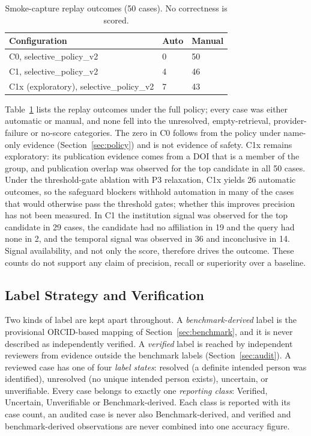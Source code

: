 \begin{table}[t]
\caption{Smoke-capture replay outcomes (50 cases). No correctness is scored.}
\label{tab:smoke-replay}
\centering
\footnotesize
\renewcommand{\arraystretch}{1.1}
\begin{tabular}{@{}p{}p{}p{}@{}}
\toprule
\textbf{Configuration} & \textbf{Auto} & \textbf{Manual} \\
\midrule
C0, selective\_policy\_v2 & 0 & 50 \\
C1, selective\_policy\_v2 & 4 & 46 \\
C1x (exploratory), selective\_policy\_v2 & 7 & 43 \\
\bottomrule
\end{tabular}
\end{table}

Table~\ref{tab:smoke-replay} lists the replay outcomes under the full policy; every case was either automatic or manual, and none fell into the unresolved, empty-retrieval, provider-failure or no-score categories. The zero in C0 follows from the policy under name-only evidence (Section~\ref{sec:policy}) and is not evidence of safety. C1x remains exploratory: its publication evidence comes from a DOI that is a member of the group, and publication overlap was observed for the top candidate in all 50 cases. Under the threshold-gate ablation with P3 relaxation, C1x yields 26 automatic outcomes, so the safeguard blockers withhold automation in many of the cases that would otherwise pass the threshold gates; whether this improves precision has not been measured. In C1 the institution signal was observed for the top candidate in 29 cases, the candidate had no affiliation in 19 and the query had none in 2, and the temporal signal was observed in 36 and inconclusive in 14. Signal availability, and not only the score, therefore drives the outcome. These counts do not support any claim of precision, recall or superiority over a baseline.

\subsection{Label Strategy and Verification}
\label{sec:labels}
Two kinds of label are kept apart throughout. A \emph{benchmark-derived} label is the provisional ORCID-based mapping of Section~\ref{sec:benchmark}, and it is never described as independently verified. A \emph{verified} label is reached by independent reviewers from evidence outside the benchmark labels (Section~\ref{sec:audit}). A reviewed case has one of four \emph{label states}: resolved (a definite intended person was identified), unresolved (no unique intended person exists), uncertain, or unverifiable. Every case belongs to exactly one \emph{reporting class}: Verified, Uncertain, Unverifiable or Benchmark-derived. Each class is reported with its case count, an audited case is never also Benchmark-derived, and verified and benchmark-derived observations are never combined into one accuracy figure.

